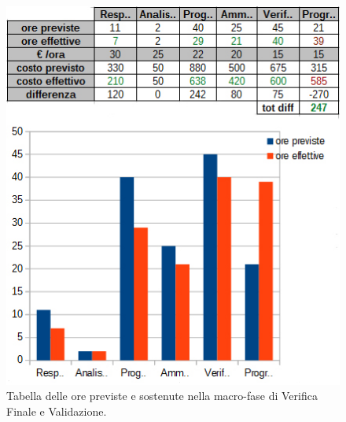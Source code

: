 \begin{figure}[H]
\begin{center}
\includegraphics[scale=0.70]{img/consuntivo-verival-tot.jpg}
\caption{Tabella delle ore previste e sostenute nella macro-fase di Verifica Finale e Validazione.}
\end{center}
\end{figure}




